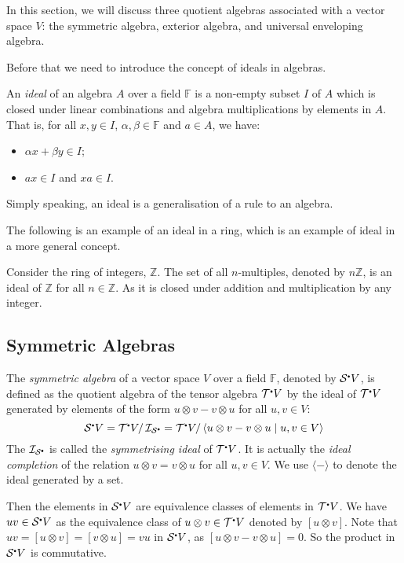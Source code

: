 \documentclass[
	11pt, %
	fleqn, %
	a4paper, %
]{LegrandOrangeBook}
\newcommand{\smallbullet}{\scalebox{0.5}{$\bullet$}}
\newcommand{\quotient}[2]{#1/\, #2} %
\newcommand{\F}{\mathbb{F}} %
\newcommand{\T}{\mathcal{T}^{\smallbullet}} %
\newcommand{\Sym}{\mathcal{S}^{\smallbullet}} %
\newcommand{\ideal}{\mathcal{I}} %
\newcommand{\Z}{\mathbb{Z}} %
\begin{document}
In this section, we will discuss three quotient algebras associated with a vector space $V$: the symmetric algebra, exterior algebra, and universal enveloping algebra.

Before that we need to introduce the concept of ideals in algebras.

\begin{definition}
    An \emph{ideal} of an algebra $A$ over a field $\F$ is a non-empty subset $I$ of $A$ which is closed under linear combinations and algebra multiplications by elements in $A$. That is, for all $x, y \in I$, $\alpha, \beta \in \F$ and $a \in A$, we have:
    \begin{itemize}
        \item $\alpha x + \beta y \in I$;
        \item $ax \in I$ and $xa \in I$.
    \end{itemize}
\end{definition}

Simply speaking, an ideal is a generalisation of a rule to an algebra.

The following is an example of an ideal in a ring, which is an example of ideal in a more general concept.
\begin{example}
    Consider the ring of integers, $\Z$. The set of all $n$-multiples, denoted by $n\Z$, is an ideal of $\Z$ for all $n \in \Z$. As it is closed under addition and multiplication by any integer.
\end{example}

\subsection{Symmetric Algebras}

The \emph{symmetric algebra} of a vector space $V$ over a field $\F$, denoted by $\Sym V$, is defined as the quotient algebra of the tensor algebra $\T V$ by the ideal of $\T V$ generated by elements of the form $u \otimes v - v \otimes u$ for all $u, v \in V$:
\[
    \Sym V = \quotient{\T V}{\ideal_{\Sym}} = \quotient{\T V}{\langle u \otimes v - v \otimes u \mid u, v \in V \rangle}
\]
The $\ideal_{\Sym}$ is called the \emph{symmetrising ideal} of $\T V$. It is actually the \emph{ideal completion} of the relation $u \otimes v = v \otimes u$ for all $u, v \in V$. We use $\langle - \rangle$ to denote the ideal generated by a set.

Then the elements in $\Sym V$ are equivalence classes of elements in $\T V$. We have $uv \in \Sym V$ as the equivalence class of $u \otimes v \in \T V$ denoted by $[u \otimes v]$. Note that $uv = [u \otimes v] = [v \otimes u] = vu$ in $\Sym V$, as $[u \otimes v - v \otimes u] = 0$. So the product in $\Sym V$ is commutative. 
\end{document}
